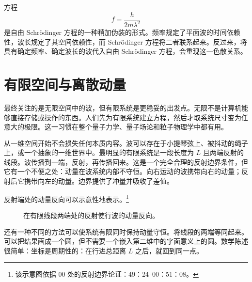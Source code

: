 方程
\begin{equation}
f=\frac{h}{2m\lambda^2}
\end{equation}
是自由 Schr\"odinger 方程的一种稍加伪装的形式。频率规定了平面波的时间依赖性，波长规定了其空间依赖性，而 Schr\"odinger 方程将二者联系起来。反过来，将具有确定频率、确定波长的波代入自由 Schr\"odinger 方程，会重现这一色散关系。

\begin{classroomqa}
\end{classroomqa}

\section{有限空间与离散动量}

最终关注的是无限空间中的波，但有限系统是更稳妥的出发点。无限不是计算机能够直接存储或操作的东西。人们先为有限系统建立方程，然后才取系统尺寸变为任意大的极限。这一习惯在整个量子力学、量子场论和粒子物理学中都有用。

从一维空间开始不会损失任何本质内容。波可以存在于小提琴弦上、被抖动的绳子上，或一个抽象的一维世界中。最明显的有限系统是一段长度为 \(L\) 且两端反射的线段。波传播到一端，反射，再传播回来。这是一个完全合理的反射边界条件，但它有一个不便之处：动量在波系统内部不守恒。向右运动的波携带向右的动量；反射后它携带向左的动量。边界提供了冲量并吸收了差值。

反射端处的动量反向可以示意性地表示。\footnote{该示意图依据 00 处的反射边界论证：49：24--00：51：08。}

\begin{figure}[t]
\centering
{}
\caption{在有限线段两端处的反射使行波的动量反向。}
\end{figure}

还有一种不同的方法可以使系统有限同时保持动量守恒。将线段的两端等同起来。可以把结果画成一个圆，但不需要一个嵌入第二维中的字面意义上的圆。数学陈述很简单：坐标是周期性的：在行进总距离 \(L\) 之后，就回到同一点。

